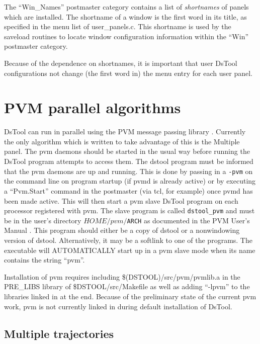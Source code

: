 The ``Win\_Names'' postmaster category contains a list of {\em shortnames}
of panels which are installed. The shortname of a window is the first
word in its title, as specified in the menu list of user\_panels.c. This
shortname is used by the saveload routines to locate window configuration
information within the ``Win'' postmaster category.

Because of the dependence on shortnames, it is important that user
DsTool configurations not change  (the first word in) the menu
entry for each user panel.

\section{PVM parallel algorithms}

DsTool can run in parallel using the PVM message passing library \cite{pvm}.
Currently the only algorithm which is written 
to take advantage of this is the Multiple panel. 
The pvm daemons should be started in the usual way before running the DsTool
program attempts to access them. The dstool program must
be informed that the pvm daemons are up and running.  This is done by passing
in a {\tt -pvm} on the command line on program startup 
(if pvmd is already active) or by executing
a ``Pvm.Start'' command in the postmaster (via tcl, for example) once pvmd has
been made active.
This will then start a pvm slave DsTool program on each processor
registered with pvm.  The slave program is called
{\tt dstool\_pvm} and must be in the user's directory {\tt $HOME/pvm/$ARCH}
as documented in the PVM User's Manual \cite{pvm}.  This
program should either be a copy of dstool or a nonwindowing version
of dstool.  Alternatively, it may be a softlink to one of the programs.
The executable will AUTOMATICALLY start up in a pvm slave mode when its
name contains the string ``pvm''.

Installation of pvm requires including 	\$(DSTOOL)/src/pvm/pvmlib.a in
the PRE\_LIBS library of \$DSTOOL/src/Makefile as well as adding
 ``-lpvm'' to the libraries linked in at the end. Because of the 
preliminary state of the current pvm work, pvm is
not currently linked in during default installation of DsTool.

\subsection{Multiple trajectories}

